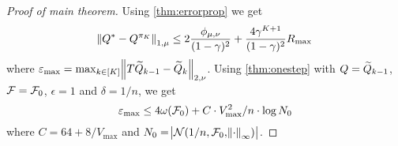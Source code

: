 








\begin{proof}[Proof of main theorem]
	Using \cref{thm:errorprop} we get
	\begin{equation}
		\norm{Q^* - Q^{\pi_K}}_{1,\mu} \leq
		2 \frac{\phi_{\mu, \nu}}{(1-\gamma)^2} +
		\frac{4 \gamma^{K+1}}{(1-\gamma)^2} R_{\max}
	\end{equation}
	where $\varepsilon_{\max} =
	\max_{k \in [K]} \norm{T \widetilde{Q}_{k-1} - \widetilde{Q}_k}_{2, \nu}$.
	Using \cref{thm:onestep} with $Q = \widetilde{Q}_{k-1}$, 
	$\mathcal{F} = \mathcal{F}_0$, $\epsilon = 1$
	and $\delta = 1/n$, we get 
	\begin{equation}
		\varepsilon_{\max} \leq 4 \omega(\mathcal{F}_0)
		+ C \cdot V_{\max}^2/n \cdot \log N_0
	\end{equation}
	where $C = 64 + 8 / V_{\max}$
	and $N_0 = \abs{\mathcal{N}(1/n, \mathcal{F}_0, \norm{\cdot}_\infty)}$.
\end{proof}
